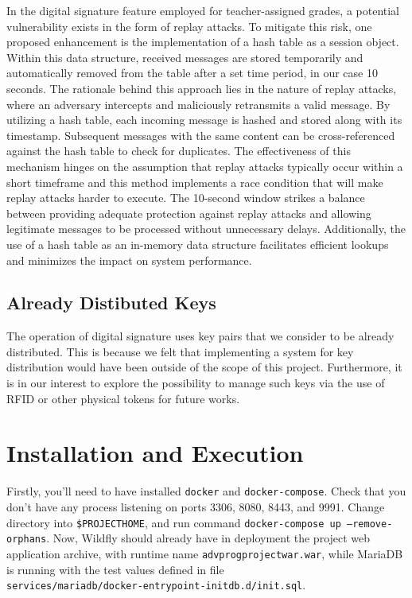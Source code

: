 In the digital signature feature employed for teacher-assigned grades, a potential vulnerability exists in the form of replay attacks. To mitigate this risk, one proposed enhancement is the implementation of a hash table as a session object. Within this data structure, received messages are stored temporarily and automatically removed from the table after a set time period, in our case 10 seconds. The rationale behind this approach lies in the nature of replay attacks, where an adversary intercepts and maliciously retransmits a valid message. By utilizing a hash table, each incoming message is hashed and stored along with its timestamp. Subsequent messages with the same content can be cross-referenced against the hash table to check for duplicates. The effectiveness of this mechanism hinges on the assumption that replay attacks typically occur within a short timeframe and this method implements a race condition that will make replay attacks harder to execute. The 10-second window strikes a balance between providing adequate protection against replay attacks and allowing legitimate messages to be processed without unnecessary delays. Additionally, the use of a hash table as an in-memory data structure facilitates efficient lookups and minimizes the impact on system performance.

\section{Already Distibuted Keys}

The operation of digital signature uses key pairs that we consider to be already distributed. This is because we felt that implementing a system for key distribution would have been outside of the scope of this project. Furthermore, it is in our interest to explore the possibility to manage such keys via the use of RFID or other physical tokens for future works.

\newpage
\chapter{Installation and Execution}

Firstly, you'll need to have installed \texttt{docker} and \texttt{docker-compose}. Check that you don't have any process listening on ports 3306, 8080, 8443, and 9991. Change directory into \texttt{\$PROJECT\textunderscore HOME}, and run command \texttt{docker-compose up --remove-orphans}. Now, Wildfly should already have in deployment the project web application archive, with runtime name \texttt{adv\textunderscore prog\textunderscore project\textunderscore war.war}, while MariaDB is running with the test values defined in file \\\texttt{services/mariadb/docker-entrypoint-initdb.d/init.sql}.

